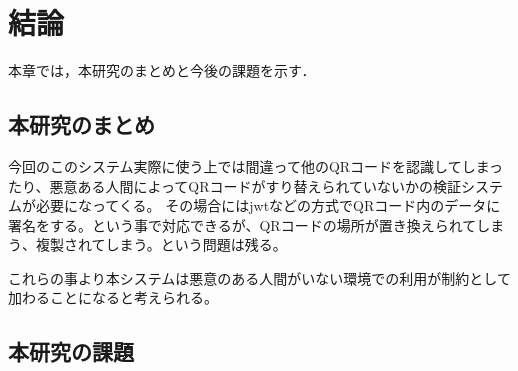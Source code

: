 \chapter{結論}
\label{conclusion}

本章では，本研究のまとめと今後の課題を示す．

\section{本研究のまとめ}
今回のこのシステム実際に使う上では間違って他のQRコードを認識してしまったり、悪意ある人間によってQRコードがすり替えられていないかの検証システムが必要になってくる。
その場合にはjwtなどの方式でQRコード内のデータに署名をする。という事で対応できるが、QRコードの場所が置き換えられてしまう、複製されてしまう。という問題は残る。

これらの事より本システムは悪意のある人間がいない環境での利用が制約として加わることになると考えられる。

\section{本研究の課題}

